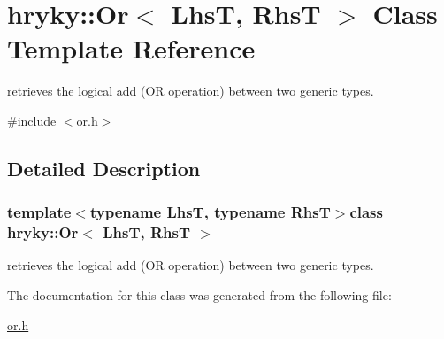 \hypertarget{classhryky_1_1_or}{\section{hryky\-:\-:Or$<$ Lhs\-T, Rhs\-T $>$ Class Template Reference}
\label{classhryky_1_1_or}
}


retrieves the logical add (O\-R operation) between two generic types.  




{\ttfamily \#include $<$or.\-h$>$}



\subsection{Detailed Description}
\subsubsection*{template$<$typename Lhs\-T, typename Rhs\-T$>$class hryky\-::\-Or$<$ Lhs\-T, Rhs\-T $>$}

retrieves the logical add (O\-R operation) between two generic types. 

The documentation for this class was generated from the following file\-:\begin{DoxyCompactItemize}
\item 
\hyperlink{or_8h}{or.\-h}\end{DoxyCompactItemize}
